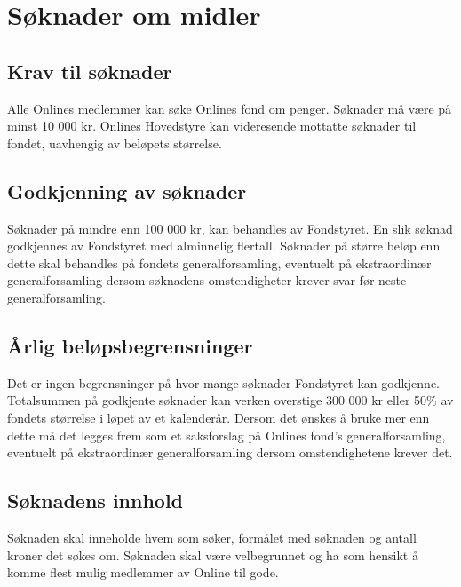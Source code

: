 \chapter{Søknader om midler}

\section{Krav til søknader}

Alle Onlines medlemmer kan søke Onlines fond om penger. Søknader må være på minst 10 000 kr. Onlines Hovedstyre kan videresende mottatte søknader til fondet, uavhengig av beløpets størrelse.
\section{Godkjenning av søknader}

Søknader på mindre enn 100 000 kr, kan behandles av Fondstyret. En slik søknad godkjennes av Fondstyret med alminnelig flertall. Søknader på større beløp enn dette skal behandles på fondets generalforsamling, eventuelt på ekstraordinær generalforsamling dersom søknadens omstendigheter krever svar før neste generalforsamling.

\section{Årlig beløpsbegrensninger}

Det er ingen begrensninger på hvor mange søknader Fondstyret kan godkjenne. Totalsummen på godkjente søknader kan verken overstige 300 000 kr eller 50\% av fondets størrelse i løpet av et kalenderår. Dersom det ønskes å bruke mer enn dette må det legges frem som et saksforslag på Onlines fond’s generalforsamling, eventuelt på ekstraordinær generalforsamling dersom omstendighetene krever det.

\section{Søknadens innhold}
Søknaden skal inneholde hvem som søker, formålet med søknaden og antall kroner det søkes om. Søknaden skal være velbegrunnet og ha som hensikt å komme flest mulig medlemmer av Online til gode.
